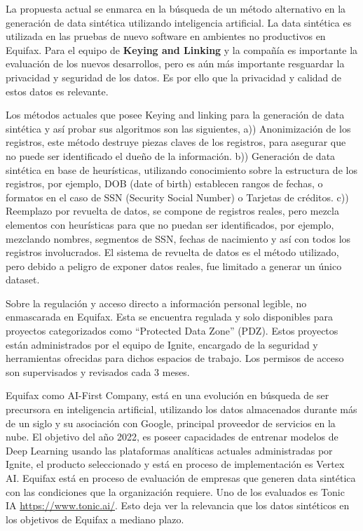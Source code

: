 La propuesta actual se enmarca en la búsqueda de un método alternativo en la generación de data sintética utilizando inteligencia artificial. La data sintética es utilizada en las pruebas de nuevo software en ambientes no productivos en Equifax. Para el equipo de \textbf{Keying and Linking} y la compañía es importante la evaluación de los nuevos desarrollos, pero es aún más importante resguardar la privacidad y seguridad de los datos. Es por ello que la privacidad y calidad de estos datos es relevante.

Los métodos actuales que posee Keying and linking para la generación de data sintética y así probar sus algoritmos son las siguientes, a)) Anonimización de los registros, este método destruye piezas claves de los registros, para asegurar que no puede ser identificado el dueño de la información. b)) Generación de data sintética en base de heurísticas, utilizando conocimiento sobre la estructura de los registros, por ejemplo, DOB (date of birth) establecen rangos de fechas, o formatos en el caso de SSN (Security Social Number) o Tarjetas de créditos. c)) Reemplazo por revuelta de datos, se compone de registros reales, pero mezcla elementos con heurísticas para que no puedan ser identificados, por ejemplo, mezclando nombres, segmentos de SSN, fechas de nacimiento y así con todos los registros involucrados. El sistema de revuelta de datos es el método utilizado, pero debido a peligro de exponer datos reales, fue limitado a generar un único dataset. 

Sobre la regulación y acceso directo a información personal legible, no enmascarada en Equifax. Esta se encuentra regulada y solo disponibles para proyectos categorizados como “Protected Data Zone” (PDZ). Estos proyectos están administrados por el equipo de Ignite, encargado de la seguridad y herramientas ofrecidas para dichos espacios de trabajo. Los permisos de acceso son supervisados y revisados cada 3 meses.

Equifax como AI-First Company, está en una evolución en búsqueda de ser precursora en inteligencia artificial, utilizando los datos almacenados durante más de un siglo y su asociación con Google, principal proveedor de servicios en la nube. El objetivo del año 2022, es poseer capacidades de entrenar modelos de Deep Learning usando las plataformas analíticas actuales administradas por Ignite, el producto seleccionado y está en proceso de implementación es Vertex AI. Equifax está en proceso de evaluación de empresas que generen data sintética con las condiciones que la organización requiere. Uno de los evaluados es Tonic IA \url{https://www.tonic.ai/}. Esto deja ver la relevancia que los datos sintéticos en los objetivos de Equifax a mediano plazo.
\newpage

